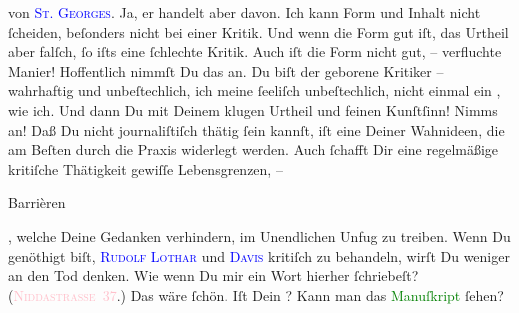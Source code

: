               von \textsc{\textcolor{blue}{St. Georges}{}\ledrightnote{\textcolor{blue}{Stefan George}}}. Ja, er handelt aber davon. Ich kann Form und Inhalt nicht ſcheiden, beſonders
               nicht bei einer Kritik. Und wenn die Form gut iſt, das Urtheil aber falſch, ſo iſts
               eine ſchlechte Kritik. Auch iſt die Form nicht gut, – verfluchte Manier! {\pb}Hoffentlich nimmſt Du das \label{K_L02771-3v}\label{K_L02771-3h} an. Du biſt der
               geborene Kritiker – wahrhaftig und unbeſtechlich, ich meine ſeeliſch unbeſtechlich,
               nicht einmal ein \label{K_L02771-4v}\label{K_L02771-4h}, wie
               ich. Und dann Du mit Deinem  klugen Urtheil und
               feinen Kunſtſinn! Nimms \strikeout{\textcolor{gray}{es}} an!  Daß Du nicht journaliſtiſch thätig ſein
               kannſt, {\pb}iſt eine Deiner Wahnideen, die am Beſten
               durch die Praxis widerlegt werden. Auch ſchafft Dir eine regelmäßige kritiſche
               Thätigkeit gewiſſe Lebensgrenzen, – \begin{otherlanguage}{french}Barrièren\end{otherlanguage},
               welche Deine Gedanken verhindern, im Unendlichen Unfug zu treiben. Wenn Du genöthigt
               biſt, \textsc{\textcolor{blue}{Rudolf Lothar}{}\ledrightnote{\textcolor{blue}{Rudolf Lothar}}} und \textsc{\textcolor{blue}{Davis}{}\ledrightnote{\textcolor{blue}{Gustav Davis}}} kritiſch zu behandeln, wirſt Du weniger an den Tod denken.\pend
           \pstart
           Wie wenn Du mir ein Wort hierher ſchriebeſt? (\textcolor{pink}{\textsc{Niddastraße 37}}{}\ledrightnote{\textcolor{pink}{Niddastraße}}.) Das wäre ſchön\textcolor{gray}{.}\pend
           \pstart
           {\pb}Iſt Dein \label{K_L02771-7v}\label{K_L02771-7h}? Kann man das \textcolor{green}{Manuſkript}{} ſehen?\pend
